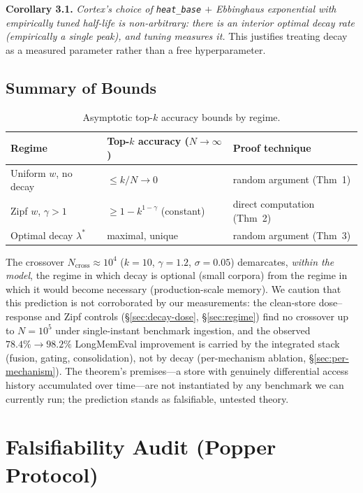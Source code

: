 \documentclass[11pt]{article}
\begin{document}
\textbf{Corollary 3.1.} \emph{Cortex's choice of
\texttt{heat\_base} $+$ Ebbinghaus exponential with empirically
tuned half-life is non-arbitrary: there is an interior optimal
decay rate (empirically a single peak), and tuning measures it.}
This justifies treating decay as a measured parameter rather than
a free hyperparameter.

\subsection{Summary of Bounds}
\label{app:erdos-summary}

\begin{table}[h]
\centering
\caption{Asymptotic top-$k$ accuracy bounds by regime.}
\label{tab:erdos-summary}
\begin{tabular}{lll}
\toprule
Regime & Top-$k$ accuracy ($N \to \infty$) & Proof technique \\
\midrule
Uniform $w$, no decay & $\le k/N \to 0$           & random argument (Thm~1) \\
Zipf $w$, $\gamma > 1$ & $\ge 1 - k^{1-\gamma}$ (constant) & direct computation (Thm~2) \\
Optimal decay $\lambda^*$ & maximal, unique       & random argument (Thm~3) \\
\bottomrule
\end{tabular}
\end{table}

The crossover $N_{\mathrm{cross}} \approx 10^4$ ($k=10$,
$\gamma=1.2$, $\sigma=0.05$) demarcates, \emph{within the model},
the regime in which decay is optional (small corpora) from the
regime in which it would become necessary (production-scale
memory).  We caution that this prediction is not corroborated by
our measurements: the clean-store dose--response and Zipf controls
(\S\ref{sec:decay-dose}, \S\ref{sec:regime}) find no crossover up
to $N = 10^5$ under single-instant benchmark ingestion, and the
observed $78.4\% \to 98.2\%$ LongMemEval improvement is carried by
the integrated stack (fusion, gating, consolidation), not by decay
(per-mechanism ablation, \S\ref{sec:per-mechanism}).  The theorem's
premises---a store with genuinely differential access history
accumulated over time---are not instantiated by any benchmark we
can currently run; the prediction stands as falsifiable, untested
theory.

\section{Falsifiability Audit (Popper Protocol)}
\label{app:popper}
\end{document}
